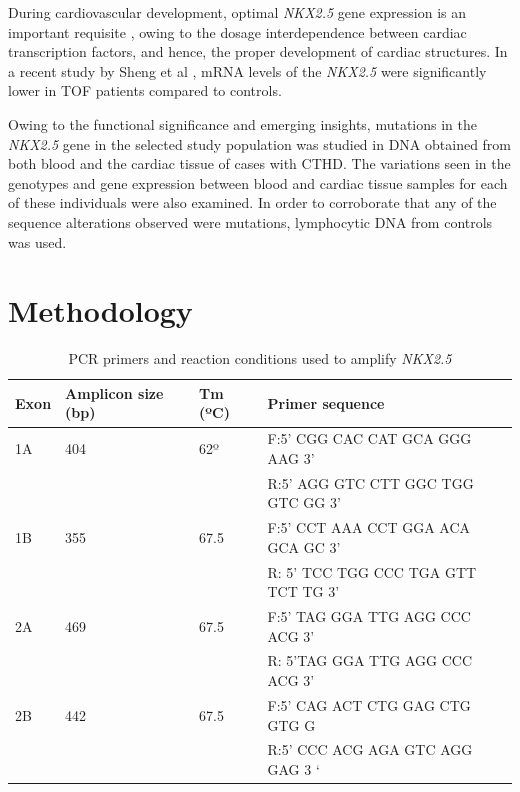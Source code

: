 \begin{refsection}
During cardiovascular development, optimal \textit{NKX2.5} gene expression is an important requisite \cite{pabst2008novel}, owing to the dosage interdependence between cardiac transcription factors, and hence, the proper development of cardiac structures. In a recent study by Sheng et al \cite{sheng2013dna}, mRNA levels of the \textit{NKX2.5} were significantly lower in TOF patients compared to controls.

Owing to the functional significance and emerging insights, mutations in the \textit{NKX2.5} gene in the selected study population was studied in DNA obtained from both blood and the cardiac tissue of cases with CTHD. The variations seen in the genotypes and gene expression between blood and cardiac tissue samples for each of these individuals were also examined. In order to corroborate that any of the sequence alterations observed were mutations, lymphocytic DNA from controls was used.

\section{Methodology}


\begin{table}[!tb]
\centering
\caption{PCR primers and reaction conditions used to amplify \textit{NKX2.5} \cite{goldmuntz2001nkx2}}
\label{tab:5_1}
\begin{tabular}{  P{0.5in} P{1in} P{0.5in} l }
\toprule
	\textbf{Exon} & \textbf{Amplicon size (bp)} & \textbf{Tm (ºC)}  & \textbf{Primer sequence} \\ \toprule
	1A & 404 & 62º & F:5’ CGG CAC CAT GCA GGG AAG 3’ \\ 
	 &  &  & R:5’ AGG GTC CTT GGC TGG GTC GG 3’ \\ \midrule
	1B & 355 & 67.5 & F:5’ CCT AAA CCT GGA ACA GCA GC 3’ \\ 
	 &  &  & R: 5’ TCC TGG CCC TGA GTT TCT TG  3’ \\ \midrule
	2A & 469 & 67.5 & F:5’ TAG GGA TTG AGG CCC ACG 3’ \\ 
	 &  &  & R: 5’TAG GGA TTG AGG CCC ACG 3’ \\ \midrule
	2B & 442 & 67.5 & F:5’ CAG ACT CTG GAG CTG GTG G \\ 
	 &  &  & R:5’ CCC ACG AGA GTC AGG GAG 3 ‘ \\ \bottomrule
\end{tabular}
\end{table}


\end{refsection}
